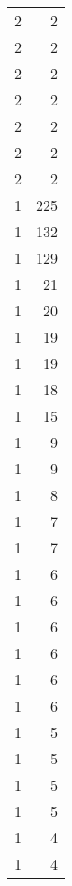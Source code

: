 \begin{tabular}{rr}
                  2 &             2 \\
                  2 &             2 \\
                  2 &             2 \\
                  2 &             2 \\
                  2 &             2 \\
                  2 &             2 \\
                  2 &             2 \\
                  1 &           225 \\
                  1 &           132 \\
                  1 &           129 \\
                  1 &            21 \\
                  1 &            20 \\
                  1 &            19 \\
                  1 &            19 \\
                  1 &            18 \\
                  1 &            15 \\
                  1 &             9 \\
                  1 &             9 \\
                  1 &             8 \\
                  1 &             7 \\
                  1 &             7 \\
                  1 &             6 \\
                  1 &             6 \\
                  1 &             6 \\
                  1 &             6 \\
                  1 &             6 \\
                  1 &             6 \\
                  1 &             5 \\
                  1 &             5 \\
                  1 &             5 \\
                  1 &             5 \\
                  1 &             4 \\
                  1 &             4 \\

\end{tabular}

